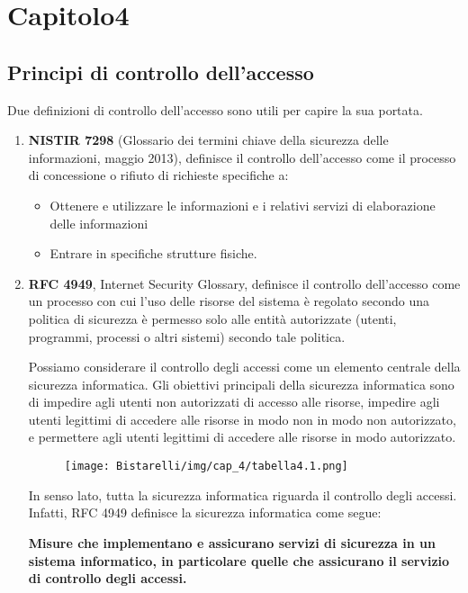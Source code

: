\newpage
\chapter{Capitolo4}
\section{Principi di controllo dell'accesso}
Due definizioni di controllo dell'accesso sono utili per capire la sua portata.
\begin{enumerate}
    \item \textbf{NISTIR 7298} (Glossario dei termini chiave della sicurezza delle informazioni, maggio 2013), definisce il controllo dell'accesso come il processo di concessione o rifiuto di richieste specifiche a:
    
    \begin{itemize}
        \item  Ottenere e utilizzare le informazioni e i relativi servizi di elaborazione delle informazioni
        
        \item  Entrare in specifiche strutture fisiche.
    \end{itemize}
    
    \item \textbf{RFC 4949}, Internet Security Glossary, definisce il controllo dell'accesso come un processo con cui l'uso delle risorse del sistema è regolato secondo una politica di sicurezza è permesso solo alle entità autorizzate (utenti, programmi, processi o altri sistemi) secondo tale politica.
    
Possiamo considerare il controllo degli accessi come un elemento centrale della sicurezza informatica. Gli obiettivi principali della sicurezza informatica sono di impedire agli utenti non autorizzati di accesso alle risorse, impedire agli utenti legittimi di accedere alle risorse in modo non in modo non autorizzato, e permettere agli utenti legittimi di accedere alle risorse in modo autorizzato.

\begin{figure}[H]
	\centering
    \texttt{[image: Bistarelli/img/cap\_4/tabella4.1.png]}
\end{figure}

In senso lato, tutta la sicurezza informatica riguarda il controllo degli accessi. Infatti, RFC 4949 definisce la sicurezza informatica come segue:

\begin{center}
    \textbf{Misure che implementano e assicurano servizi di sicurezza in un sistema informatico, in particolare quelle che assicurano il servizio di controllo degli accessi.}
\end{center}
\end{enumerate}
\newpage
